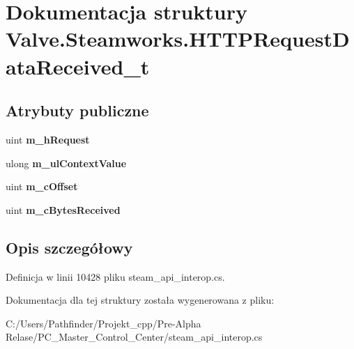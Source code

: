 \hypertarget{struct_valve_1_1_steamworks_1_1_h_t_t_p_request_data_received__t}{}\section{Dokumentacja struktury Valve.\+Steamworks.\+H\+T\+T\+P\+Request\+Data\+Received\+\_\+t}
\label{struct_valve_1_1_steamworks_1_1_h_t_t_p_request_data_received__t}
\subsection*{Atrybuty publiczne}
\begin{DoxyCompactItemize}
\item 
\mbox{\label{struct_valve_1_1_steamworks_1_1_h_t_t_p_request_data_received__t_a73ad381c87b7f08bee470f0773483cc7}} 
uint {\bfseries m\+\_\+h\+Request}
\item 
\mbox{\label{struct_valve_1_1_steamworks_1_1_h_t_t_p_request_data_received__t_a847a821e18218f62ddfa99d65f88e39d}} 
ulong {\bfseries m\+\_\+ul\+Context\+Value}
\item 
\mbox{\label{struct_valve_1_1_steamworks_1_1_h_t_t_p_request_data_received__t_a2a2f677e3ef93082c7685f3480cdd734}} 
uint {\bfseries m\+\_\+c\+Offset}
\item 
\mbox{\label{struct_valve_1_1_steamworks_1_1_h_t_t_p_request_data_received__t_ac070e79448672f6cd52ed67748e5c748}} 
uint {\bfseries m\+\_\+c\+Bytes\+Received}
\end{DoxyCompactItemize}


\subsection{Opis szczegółowy}


Definicja w linii 10428 pliku steam\+\_\+api\+\_\+interop.\+cs.



Dokumentacja dla tej struktury została wygenerowana z pliku\+:\begin{DoxyCompactItemize}
\item 
C\+:/\+Users/\+Pathfinder/\+Projekt\+\_\+cpp/\+Pre-\/\+Alpha Relase/\+P\+C\+\_\+\+Master\+\_\+\+Control\+\_\+\+Center/steam\+\_\+api\+\_\+interop.\+cs\end{DoxyCompactItemize}
